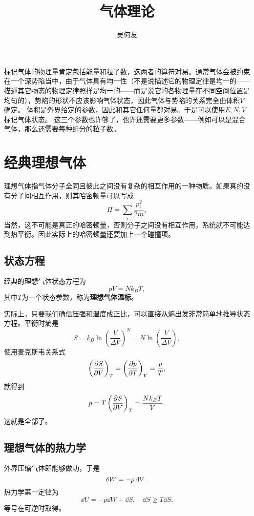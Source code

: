 \documentclass[hyperref, UTF8, a4paper]{ctexart}
\title{气体理论}
\author{吴何友}
\begin{document}
\maketitle

标记气体的物理量肯定包括能量和粒子数，这两者的算符对易。通常气体会被约束在一个深势陷当中，由于气体具有均一性（不是说描述它的物理定律是均一的——描述其它物态的物理定律照样是均一的——而是说它的各物理量在不同空间位置是均匀的），势陷的形状不应该影响气体状态，因此气体与势陷的关系完全由体积$V$确定。
体积是外界给定的参数，因此和其它任何量都对易。于是可以使用$E, N, V$标记气体状态。
这三个参数也许够了，也许还需要更多参数——例如可以是混合气体，那么还需要每种组分的粒子数。

\section{经典理想气体}

理想气体指气体分子全同且彼此之间没有复杂的相互作用的一种物质。如果真的没有分子间相互作用，则其哈密顿量可以写成
\begin{equation}
    H = \sum_i \frac{p_i^2}{2m},
\end{equation}
当然，这不可能是真正的哈密顿量，否则分子之间没有相互作用，系统就不可能达到热平衡。因此实际上的哈密顿量还要加上一个碰撞项。

\subsection{状态方程}

经典的理想气体状态方程为
\begin{equation}
    pV=N k_B T,
\end{equation}
其中$T$为一个状态参数，称为\textbf{理想气体温标}。

实际上，只要我们确信压强和温度成正比，可以直接从熵出发非常简单地推导状态方程。平衡时熵是
\[
    S = k_B \ln \left(\frac{V}{\Delta V}\right)^N = N \ln \left( \frac{V}{\Delta V} \right),
\]
使用麦克斯韦关系式
\[
    \left( \pdv{S}{V} \right)_T = \left( \pdv{p}{T} \right)_V = \frac{p}{T},
\]
就得到
\[
    p = T \left( \pdv{S}{V} \right)_T = \frac{N k_B T}{V}.
\]
这就是全部了。

\subsection{理想气体的热力学}

外界压缩气体即能够做功，于是
\begin{equation}
    \var{W} = - p \dd{V}.
\end{equation}
热力学第一定律为
\begin{equation}
    \dd{U} = - p \dd{W} + \dd{S}, \quad \dd{S} \geq T \dd{S}.
\end{equation}
等号在可逆时取得。
\end{document}
